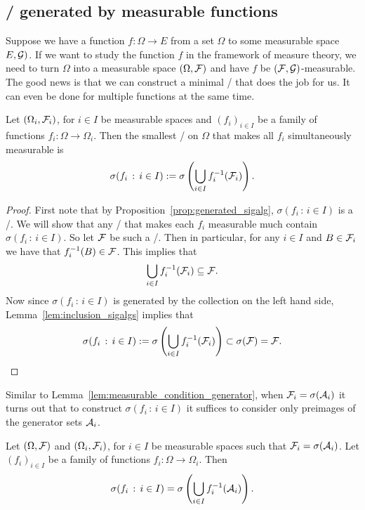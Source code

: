 \subsection{\sigalgs/ generated by measurable functions}

Suppose we have a function $f : \Omega \to E$ from a set $\Omega$ to some measurable space $E, \mathcal G)$. If we want to study the function $f$ in the framework of measure theory, we need to turn $\Omega$ into a measurable space $(\Omega, \mathcal F)$ and have $f$ be $(\mathcal F, \mathcal G)$-measurable. The good news is that we can construct a minimal \sigalg/ that does the job for us. It can even be done for multiple functions at the same time.

\begin{proposition}\label{prop:sigalg_generated_functions}
Let $(\Omega_i, \mathcal F_i)$, for $i \in I$ be measurable spaces and $(f_i)_{i \in I}$ be a family of functions $f_i : \Omega \to \Omega_i$. Then the smallest \sigalg/ on $\Omega$ that makes all $f_i$ simultaneously measurable is
\[
	\sigma(f_i \, : \, i \in I):=\sigma\left(\bigcup_{i \in I} f_i^{-1}(\mathcal F_i)\right).
\] 
\end{proposition}

\begin{proof}
First note that by Proposition~\ref{prop:generated_sigalg}, $\sigma(f_i \, : \, i \in I)$ is a \sigalg/. We will show that any \sigalg/ that makes each $f_i$ measurable much contain $\sigma(f_i \, : \, i \in I)$. So let $\mathcal F$ be such a \sigalg/. Then in particular, for any $i\in I$ and $B \in \mathcal F_i$ we have that $f_i^{-1}(B) \in \mathcal F$. This implies that
\[
	\bigcup_{i \in I} f_i^{-1}(\mathcal F_i) \subseteq \mathcal F.
\]
Now since $\sigma(f_i \, : \, i \in I)$ is generated by the collection on the left hand side, Lemma~\ref{lem:inclusion_sigalgs} implies that 
\[
	\sigma(f_i \, : \, i \in I):=\sigma\left(\bigcup_{i \in I} f_i^{-1}(\mathcal F_i)\right) \subset \sigma(\mathcal F) = \mathcal F.
\]
\end{proof}

Similar to Lemma~\ref{lem:measurable_condition_generator}, when $\mathcal F_i = \sigma(\mathcal A_i)$ it turns out that to construct $\sigma(f_i \, : \, i \in I)$ it suffices to consider only preimages of the generator sets $\mathcal A_i$.

\begin{proposition}\label{prop:extension_measurable_function}
Let $(\Omega, \mathcal F)$ and $(\Omega_i, \mathcal F_i)$, for $i \in I$ be measurable spaces such that $\mathcal F_i = \sigma(\mathcal A_i)$. Let $(f_i)_{i \in I}$ be a family of functions $f_i : \Omega \to \Omega_i$. Then 
\[
	\sigma(f_i \, : \, i \in I) = \sigma\left(\bigcup_{i \in I} f_i^{-1}(\mathcal A_i)\right).
\] 
\end{proposition}

